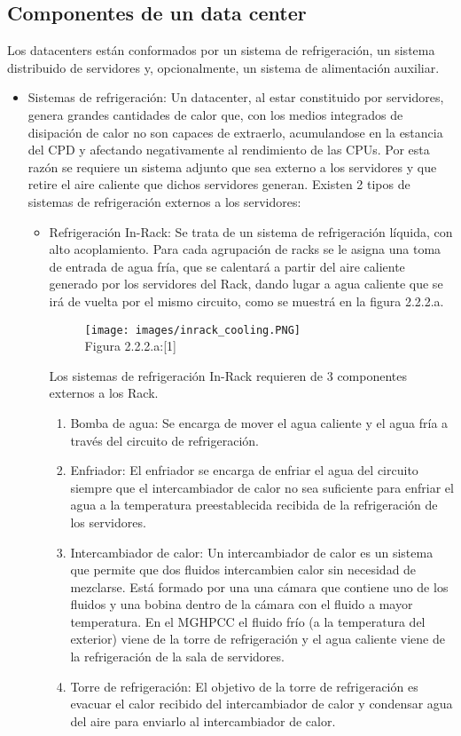 \subsection{Componentes de un data center}
Los datacenters están conformados por un sistema de refrigeración, un sistema distribuido de servidores y, opcionalmente, un sistema de alimentación auxiliar.
\begin{itemize}
\item Sistemas de refrigeración: Un datacenter, al estar constituido por servidores, genera grandes cantidades de calor que, con los medios integrados de disipación de calor no son capaces de extraerlo, acumulandose en la estancia del CPD y afectando negativamente al rendimiento de las CPUs. Por esta razón se requiere un sistema adjunto que sea externo a los servidores y que retire el aire caliente que dichos servidores generan. Existen 2 tipos de sistemas de refrigeración externos a los servidores: 
\begin{itemize}
\item Refrigeración In-Rack: Se trata de un sistema de refrigeración líquida, con alto acoplamiento. Para cada agrupación de racks se le asigna una toma de entrada de agua fría, que se calentará a partir del aire caliente generado por los servidores del Rack, dando lugar a agua caliente que se irá de vuelta por el mismo circuito, como se muestrá en la figura 2.2.2.a.
\begin{figure}[H]
\begin{center}
\texttt{[image: images/inrack\_cooling.PNG]}
\\[0.5cm]
Figura 2.2.2.a:[1]
\end{center}
\end{figure}
Los sistemas de refrigeración In-Rack requieren de 3 componentes externos a los Rack.

\begin{enumerate}
\item Bomba de agua: Se encarga de mover el agua caliente y el agua fría a través del circuito de refrigeración.
\item Enfriador: El enfriador se encarga de enfriar el agua del circuito siempre que el intercambiador de calor no sea suficiente para enfriar el agua a la temperatura preestablecida recibida de la refrigeración de los servidores.
\item Intercambiador de calor: Un intercambiador de calor es un sistema que permite que dos fluidos intercambien calor sin necesidad de mezclarse. Está formado por una una cámara que contiene uno de los fluidos y una bobina dentro de la cámara con el fluido a mayor temperatura. En el MGHPCC el fluido frío (a la temperatura del exterior) viene de la torre de refrigeración y el agua caliente viene de la refrigeración de la sala de servidores.
\item Torre de refrigeración: El objetivo de la torre de refrigeración es evacuar el calor recibido del intercambiador de calor y condensar agua del aire para enviarlo al intercambiador de calor.


\end{enumerate}
\end{itemize}
\end{itemize}
